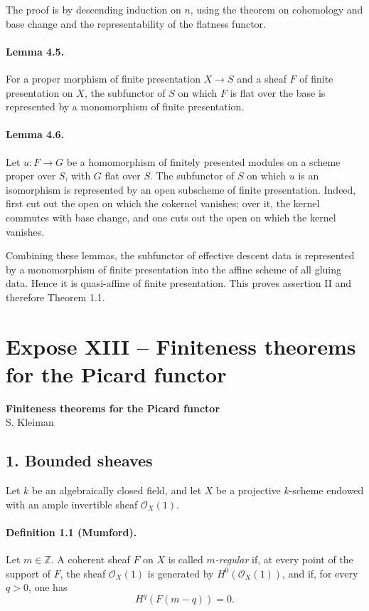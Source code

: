 \documentclass[12pt]{article}
\newcommand{\ZZ}{\mathbb Z}
\newcommand{\cO}{\mathcal O}
\begin{document}
The proof is by descending induction on $n$, using the theorem on cohomology and base change and the representability of the flatness functor.

\paragraph{Lemma 4.5.}
For a proper morphism of finite presentation $X\to S$ and a sheaf $F$ of finite presentation on $X$, the subfunctor of $S$ on which $F$ is flat over the base is represented by a monomorphism of finite presentation.

\paragraph{Lemma 4.6.}
Let $u:F\to G$ be a homomorphism of finitely presented modules on a scheme proper over $S$, with $G$ flat over $S$. The subfunctor of $S$ on which $u$ is an isomorphism is represented by an open subscheme of finite presentation. Indeed, first cut out the open on which the cokernel vanishes; over it, the kernel commutes with base change, and one cuts out the open on which the kernel vanishes.

Combining these lemmas, the subfunctor of effective descent data is represented by a monomorphism of finite presentation into the affine scheme of all gluing data. Hence it is quasi-affine of finite presentation. This proves assertion II and therefore Theorem 1.1.

\section*{Expose XIII -- Finiteness theorems for the Picard functor}

\begin{center}
{\large\textbf{Finiteness theorems for the Picard functor}}\\[0.25em]
{\normalsize S. Kleiman}
\end{center}


\subsection*{1. Bounded sheaves}

Let $k$ be an algebraically closed field, and let $X$ be a projective $k$-scheme endowed with an ample invertible sheaf $\cO_X(1)$.

\paragraph{Definition 1.1 (Mumford).}
Let $m\in\ZZ$. A coherent sheaf $F$ on $X$ is called \emph{$m$-regular} if, at every point of the support of $F$, the sheaf $\cO_X(1)$ is generated by $H^0(\cO_X(1))$, and if, for every $q>0$, one has
\[
H^q(F(m-q))=0.
\]
\end{document}
